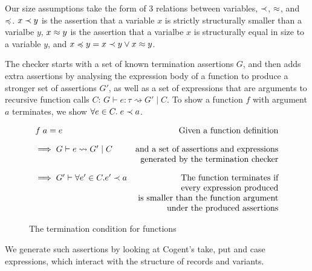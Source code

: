 Our size assumptions take the form of 3 relations between variables, $\prec$, $\approx$, 
and $\preccurlyeq$. $x \prec y$ is the assertion that a variable $x$ is strictly
structurally smaller than a varialbe $y$, $x \approx y$ is the assertion that a
varialbe $x$ is structurally equal in size to a variable $y$, and
$x \preccurlyeq y = x \prec y \lor x \approx y$.

The checker starts with a set of known termination assertions $G$, and then adds
extra assertions by analysing the expression body of a function to produce
a stronger set of assertions $G'$, as well as a set of expressions that are arguments
to recursive function calls $C$: $G \vdash e : \tau \rightsquigarrow G'\; |\; C$.
To show a function $f$ with argument $a$ terminates, we show $\forall e \in C.\; e \prec a$.

\begin{figure}
    \centering
    \[
        \begin{array}{lr}
            f\; a = e              
                & \text{Given a function definition} \\[10pt]
            \implies G \vdash e \rightsquigarrow G'\; |\; C
                & \text{and a set of assertions and 
                        expressions} \\
                & \text{generated by the termination checker} \\[10pt]
            \implies G' \vdash \forall e' \in C. e' \prec a
                & \text{The function terminates if} \\
                & \text{every expression produced} \\
                & \text{is smaller than the function argument} \\
                & \text{under the produced assertions}
        \end{array}
    \]

    
    \caption{The termination condition for functions}
    \label{fig:terminationcondition}
\end{figure}

We generate such assertions by looking at Cogent's \textsf{take}, \textsf{put} and \textsf{case}
expressions, which interact with the structure of records and variants.

